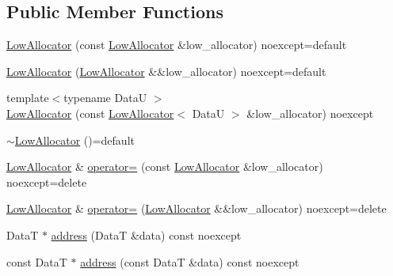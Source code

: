 \subsection*{Public Member Functions}
\begin{DoxyCompactItemize}
\item 
\hyperlink{structmage_1_1_double_ended_memory_stack_1_1_low_allocator_ad2de0c8d250130d5bd9c730f4ff5726c}{Low\+Allocator} (const \hyperlink{structmage_1_1_double_ended_memory_stack_1_1_low_allocator}{Low\+Allocator} \&low\+\_\+allocator) noexcept=default
\item 
\hyperlink{structmage_1_1_double_ended_memory_stack_1_1_low_allocator_ae72c7a214cad73bed8a3503b168ad960}{Low\+Allocator} (\hyperlink{structmage_1_1_double_ended_memory_stack_1_1_low_allocator}{Low\+Allocator} \&\&low\+\_\+allocator) noexcept=default
\item 
{\footnotesize template$<$typename DataU $>$ }\\\hyperlink{structmage_1_1_double_ended_memory_stack_1_1_low_allocator_a1faf25bcb1999a1f1f31dd0a9a32512e}{Low\+Allocator} (const \hyperlink{structmage_1_1_double_ended_memory_stack_1_1_low_allocator}{Low\+Allocator}$<$ DataU $>$ \&low\+\_\+allocator) noexcept
\item 
\hyperlink{structmage_1_1_double_ended_memory_stack_1_1_low_allocator_a27347818f8babe64abc64db773f655c0}{$\sim$\+Low\+Allocator} ()=default
\item 
\hyperlink{structmage_1_1_double_ended_memory_stack_1_1_low_allocator}{Low\+Allocator} \& \hyperlink{structmage_1_1_double_ended_memory_stack_1_1_low_allocator_a23f8384b9edf1ccb30673d128889c47b}{operator=} (const \hyperlink{structmage_1_1_double_ended_memory_stack_1_1_low_allocator}{Low\+Allocator} \&low\+\_\+allocator) noexcept=delete
\item 
\hyperlink{structmage_1_1_double_ended_memory_stack_1_1_low_allocator}{Low\+Allocator} \& \hyperlink{structmage_1_1_double_ended_memory_stack_1_1_low_allocator_a7b567dbb4462d9a844154e4ed585f636}{operator=} (\hyperlink{structmage_1_1_double_ended_memory_stack_1_1_low_allocator}{Low\+Allocator} \&\&low\+\_\+allocator) noexcept=delete
\item 
DataT $\ast$ \hyperlink{structmage_1_1_double_ended_memory_stack_1_1_low_allocator_a5c8652dba997772c31e4d9fe3544d800}{address} (DataT \&data) const noexcept
\item 
const DataT $\ast$ \hyperlink{structmage_1_1_double_ended_memory_stack_1_1_low_allocator_a2534642d00a890a97b262c47388c2c60}{address} (const DataT \&data) const noexcept

\end{DoxyCompactItemize}
